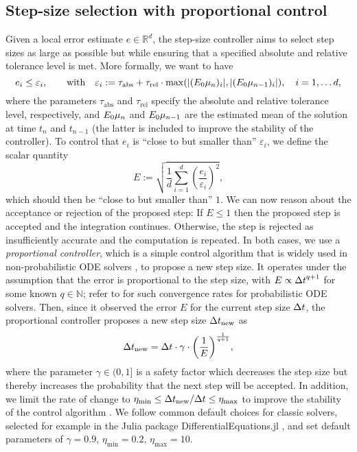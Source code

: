 \documentclass{mimosis}
\begin{document}
\subsection{Step-size selection with proportional control}
\label{sec:orgb3162b2}
Given a local error estimate \(e \in \mathbb{R}^d\), the step-size controller aims to select step sizes as large as possible but while ensuring that a specified absolute and relative tolerance level is met.
More formally, we want to have
\begin{equation}
  e_i \leq \varepsilon_i, \qquad \text{with} \quad \varepsilon_i := \tau_\text{abs} + \tau_\text{rel} \cdot \max \left( \left| (\proj{0}\mean{n})_i \right|, \left| (\proj{0}\mean{n-1})_i \right| \right), \quad i=1, \dots d,
\end{equation}
where the parameters \(\tau_\text{abs}\) and \(\tau_\text{rel}\) specify the absolute and relative tolerance level, respectively,
and \(E_{0}\mu_{n}\) and \(E_{0}\mu_{n-1}\) are the estimated mean of the solution at time \(t_n\) and \(t_{n-1}\) (the latter is included to improve the stability of the controller).
To control that \(e_i\) is ``close to but smaller than'' \(\varepsilon_i\), we define the scalar quantity
\begin{equation}
  \label{eq:scalarerror}
  E := \sqrt{ \frac{1}{d} \sum_{i=1}^d \left( \frac{e_i}{\varepsilon_i} \right)^2 },
\end{equation}
which should then be ``close to but smaller than'' \(1\).
We can now reason about the acceptance or rejection of the proposed step:
If \(E \leq 1\) then the proposed step is accepted and the integration continues.
Otherwise, the step is rejected as insufficiently accurate and the computation is repeated.
In both cases, we use a \emph{proportional controller},
which is a simple control algorithm that is widely used in non-probabilistic ODE solvers \parencite{hairer2008solving},
to propose a new step size.
It operates under the assumption that the error is proportional to the step size, with \(E \propto {\Delta t}^{q+1}\) for some known \(q \in \mathbb{N}\);
refer to \textcite{kersting18_conver_rates_gauss_ode_filter} for such convergence rates for probabilistic ODE solvers.
Then, since it observed the error \(E\) for the current step size \({\Delta t}\), the proportional controller proposes a new step size \({\Delta t}_\text{new}\) as
\begin{equation}
  \dt_\text{new} = \dt \cdot \gamma \cdot \left( \frac{1}{E} \right)^{\frac{1}{q+1}},
\end{equation}
where the parameter \(\gamma \in (0, 1]\) is a safety factor which decreases the step size but thereby increases the probability that the next step will be accepted.
In addition, we limit the rate of change to
\(\eta_\text{min} \leq {\Delta t}_\text{new} / {\Delta t} \leq \eta_\text{max}\)
to improve the stability of the control algorithm
\parencite{hairer2008solving}.
We follow common default choices for classic solvers, selected for example in the Julia package DifferentialEquations.jl
\parencite{rackauckas2017differentialequations},
and set default parameters of
\(\gamma=0.9\), \(\eta_\text{min}=0.2\), \(\eta_\text{max}=10\).
\end{document}
